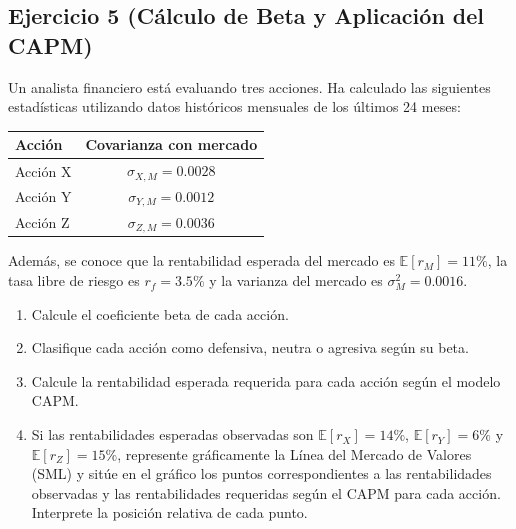 \documentclass[12pt,a4paper]{article}
\newcommand{\E}{\mathbb{E}}
\newenvironment{ejercicio}[1]{\subsection*{Ejercicio #1}}{}
\begin{document}
\begin{ejercicio}{5 (Cálculo de Beta y Aplicación del CAPM)}
Un analista financiero está evaluando tres acciones. Ha calculado las siguientes estadísticas utilizando datos históricos mensuales de los últimos 24 meses:
\begin{center}
\begin{tabular}{lc}
\toprule
Acción & Covarianza con mercado \\
\midrule
Acción X & $\sigma_{X,M} = 0.0028$ \\
Acción Y & $\sigma_{Y,M} = 0.0012$ \\
Acción Z & $\sigma_{Z,M} = 0.0036$ \\
\bottomrule
\end{tabular}
\end{center}

Además, se conoce que la rentabilidad esperada del mercado es $\E[r_M] = 11\%$, la tasa libre de riesgo es $r_f = 3.5\%$ y la varianza del mercado es $\sigma_M^2 = 0.0016$.

\begin{enumerate}[label=\alph*)]
  \item Calcule el coeficiente beta de cada acción.
  \item Clasifique cada acción como defensiva, neutra o agresiva según su beta.
  \item Calcule la rentabilidad esperada requerida para cada acción según el modelo CAPM.
  \item Si las rentabilidades esperadas observadas son $\E[r_X] = 14\%$, $\E[r_Y] = 6\%$ y $\E[r_Z] = 15\%$, represente gráficamente la Línea del Mercado de Valores (SML) y sitúe en el gráfico los puntos correspondientes a las rentabilidades observadas y las rentabilidades requeridas según el CAPM para cada acción. Interprete la posición relativa de cada punto.
\end{enumerate}
\end{ejercicio}
\end{document}
